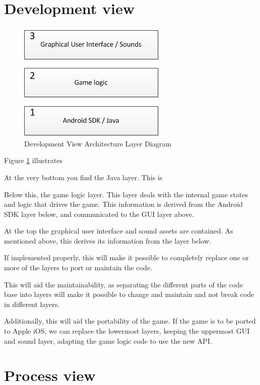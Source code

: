\section{Development view}


\begin{figure}[ht]
    \includegraphics{DevelopmentView.png}
    \caption{Development View Architecture Layer Diagram}
    \label{fig:DevelopmentView}
\end{figure}

Figure \ref{fig:DevelopmentView} illustrates 


At the very bottom you find the Java layer. This is 


Below this, the game logic layer. This layer deals with the internal game states and logic that drives the game. This information is derived from the Android SDK layer below, and communicated to the GUI layer above.


At the top the graphical user interface and sound assets are contained. As mentioned above, this derives its information from the layer below.

If implemented properly, this will make it possible to completely replace one or more of the layers to port or maintain the code.


This will aid the maintainability, as separating the different parts of the code base into layers will make it possible to change and maintain and not break code in different layers.

Additionally, this will aid the portability of the game. If the game is to be ported to Apple iOS, we can replace the lowermost layers, keeping the uppermost GUI and sound layer, adapting the game logic code to use the new API.



\section{Process view}

